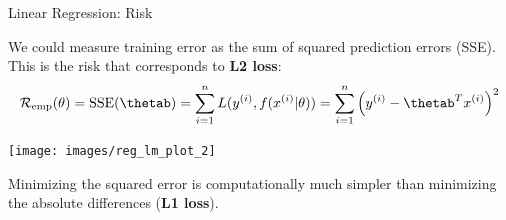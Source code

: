 \documentclass[11pt,compress,t,notes=noshow, xcolor=table]{beamer}
\newenvironment{knitrout}{}{} %
\begin{document}
\begin{frame}{Linear Regression: Risk}

We could measure training error as the sum of squared prediction errors (SSE). This is the risk that corresponds to \textbf{L2 loss}:
\[
\risket = \operatorname{SSE}(\thetab) = \sumin \Lxyit = \sumin \left(\yi - \thetab^T \xi\right)^2
\]

\begin{knitrout}\scriptsize
{}\color{fgcolor}

{\centering \texttt{[image: images/reg\_lm\_plot\_2]} 

}



\end{knitrout}

Minimizing the squared error is computationally much simpler than minimizing the absolute differences (\textbf{L1 loss}).

\end{frame}
\end{document}
